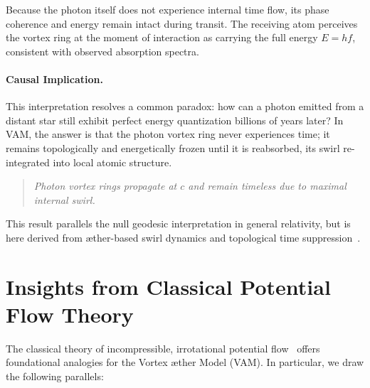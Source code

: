         Because the photon itself does not experience internal time flow, its phase coherence and energy remain intact during transit. The receiving atom perceives the vortex ring at the moment of interaction as carrying the full energy $E = h f$, consistent with observed absorption spectra.

        \paragraph{Causal Implication.}
        This interpretation resolves a common paradox: how can a photon emitted from a distant star still exhibit perfect energy quantization billions of years later? In VAM, the answer is that the photon vortex ring never experiences time; it remains topologically and energetically frozen until it is reabsorbed, its swirl re-integrated into local atomic structure.

        \begin{quote}
            \emph{Photon vortex rings propagate at  $c$  and remain timeless due to maximal internal swirl.}
        \end{quote}

        This result parallels the null geodesic interpretation in general relativity, but is here derived from æther-based swirl dynamics and topological time suppression~\cite{iskandarani2025b, battye1998}.

\section{Insights from Classical Potential Flow Theory}
        The classical theory of incompressible, irrotational potential flow~\cite{caughey2008} offers foundational analogies for the Vortex \ae ther Model (VAM). In particular, we draw the following parallels:


